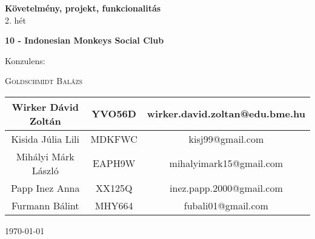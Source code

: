 
\begin{titlepage}

	\centering
	
	\vspace*{\baselineskip}
	
	
	
	\vspace{0.75\baselineskip}

	\textbf{\LARGE Követelmény, projekt, funkcionalitás\\ }
	\vspace{0.75\baselineskip}
	{\Large 2. hét}
	
	
	\vspace{2\baselineskip}
	
	
	\textbf{\Large 10 - Indonesian Monkeys Social Club}
	
	\vspace*{3\baselineskip}
	
	Konzulens:
	
	\vspace{0.5\baselineskip}
	
	{\scshape\Large Goldschmidt Balázs\\} 
	
	\vfill
	
	\begin{tabular}{ |c|c|c| }

		\hline
		Wirker Dávid Zoltán & YVO56D & wirker.david.zoltan@edu.bme.hu \\
		\hline
		Kisida Júlia Lili & MDKFWC & kisj99@gmail.com \\
		\hline
		Mihályi Márk László & EAPH9W & mihalyimark15@gmail.com \\
		\hline
		Papp Inez Anna & XX125Q & inez.papp.2000@gmail.com	\\
		\hline
		Furmann Bálint & MHY664 & fubali01@gmail.com \\
		\hline
	\end{tabular}

	\begin{flushright}
		\today
	\end{flushright}

\end{titlepage}
